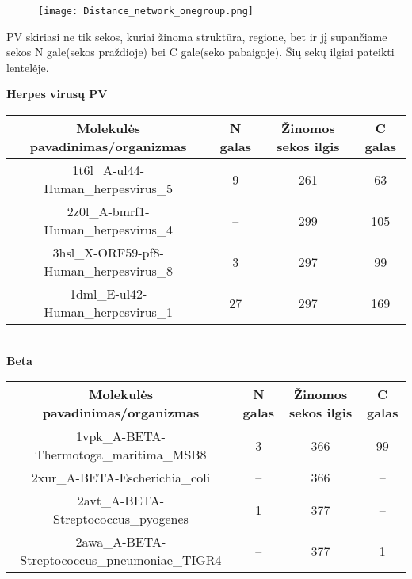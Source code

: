 \documentclass[a4paper,12pt]{article}
\begin{document}
\begin{figure}[!tph]
	\centering
	\hspace*{-5cm}
    \texttt{[image: Distance\_network\_onegroup.png]}
    \label{fig:verticalcell}
\end{figure}
\clearpage



PV skiriasi ne tik sekos, kuriai žinoma struktūra, regione, bet ir jį supančiame sekos N gale(sekos praždioje) bei C gale(seko pabaigoje). Šių sekų ilgiai pateikti lentelėje.


\vspace{1cm}
\large
\textbf{Herpes virusų PV}
\normalsize

\begin{frame}
\centering
\hspace*{-2cm}
\begin{tabular}{|c|c|c|c|}		\hline
\textbf{ Molekulės pavadinimas/organizmas } & \textbf{N galas} & 
\textbf{Žinomos sekos ilgis} &  \textbf{C galas} 			\\ \hline

1t6l\_A-ul44-Human\_herpesvirus\_5 & 9 & 261 & 63 					\\ \hline

2z0l\_A-bmrf1-Human\_herpesvirus\_4 & -- & 299 & 105 				\\ \hline

3hsl\_X-ORF59-pf8-Human\_herpesvirus\_8 & 3 & 297 & 99 				\\ \hline
		
1dml\_E-ul42-Human\_herpesvirus\_1 & 27 & 297 & 169 					\\ \hline
\end{tabular} 
\end{frame}\\

\vspace{1cm}
\large\textbf{Beta}
\normalsize

\begin{frame}
\centering
\hspace*{-2cm}
\begin{tabular}{|c|c|c|c|} \hline

\textbf{ Molekulės pavadinimas/organizmas } & \textbf{N galas} &  
\textbf{Žinomos sekos ilgis} &  \textbf{C galas} 			\\ \hline

1vpk\_A-BETA-Thermotoga\_maritima\_MSB8 & 3 & 366 & 99 				\\ \hline

2xur\_A-BETA-Escherichia\_coli & -- & 366 & -- 						\\ \hline
		
2avt\_A-BETA-Streptococcus\_pyogenes & 1 &  377 & -- 				\\ \hline

2awa\_A-BETA-Streptococcus\_pneumoniae\_TIGR4 & -- & 377 & 1 			\\ \hline
\end{tabular} 
\end{frame}\\
\end{document}
